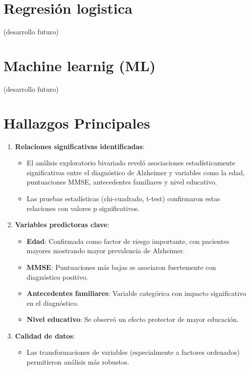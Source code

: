 \documentclass[
  letterpaper,
  DIV=11,
  numbers=noendperiod]{scrartcl}
\providecommand{\tightlist}{%
  \setlength{\itemsep}{0pt}\setlength{\parskip}{0pt}}\usepackage{longtable,booktabs,array}
\begin{document}
\section{Regresión logistica}\label{regresiuxf3n-logistica}

(desarrollo futuro)

\section{Machine learnig (ML)}\label{machine-learnig-ml}

(desarrollo futuro)

\section{\texorpdfstring{\textbf{Hallazgos
Principales}}{Hallazgos Principales}}\label{hallazgos-principales}

\begin{enumerate}
\def\labelenumi{\arabic{enumi}.}
\item
  \textbf{Relaciones significativas identificadas}:

  \begin{itemize}
  \item
    El análisis exploratorio bivariado reveló asociaciones
    estadísticamente significativas entre el diagnóstico de Alzheimer y
    variables como la edad, puntuaciones MMSE, antecedentes familiares y
    nivel educativo.
  \item
    Las pruebas estadísticas (chi-cuadrado, t-test) confirmaron estas
    relaciones con valores p significativos.
  \end{itemize}
\item
  \textbf{Variables predictoras clave}:

  \begin{itemize}
  \item
    \textbf{Edad}: Confirmada como factor de riesgo importante, con
    pacientes mayores mostrando mayor prevalencia de Alzheimer.
  \item
    \textbf{MMSE}: Puntuaciones más bajas se asociaron fuertemente con
    diagnóstico positivo.
  \item
    \textbf{Antecedentes familiares}: Variable categórica con impacto
    significativo en el diagnóstico.
  \item
    \textbf{Nivel educativo}: Se observó un efecto protector de mayor
    educación.
  \end{itemize}
\item
  \textbf{Calidad de datos}:

  \begin{itemize}
  \tightlist
  \item
    Las transformaciones de variables (especialmente a factores
    ordenados) permitieron análisis más robustos.
  \end{itemize}
\end{enumerate}
\end{document}
